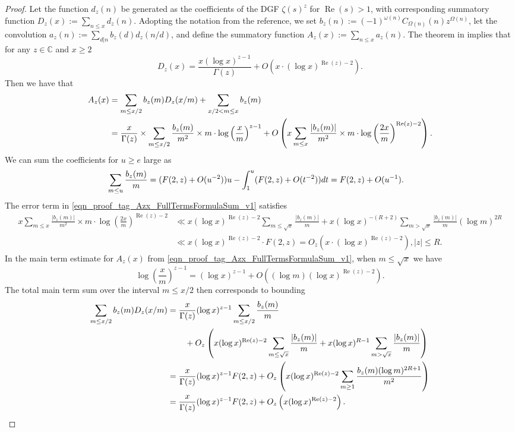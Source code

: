 \documentclass[11pt,reqno,a4letter]{article}
\numberwithin{figure}{section}
\numberwithin{table}{section}
\theoremstyle{plain}
\numberwithin{theorem}{section}
\theoremstyle{definition}
\renewcommand{\Re}{\operatorname{Re}}
\begin{document}
\begin{proof}
Let the function $d_z(n)$ be generated as the coefficients of the DGF 
$\zeta(s)^{z}$ for $\Re(s) > 1$, with corresponding 
summatory function $D_z(x) := \sum_{n \leq x} d_z(n)$. 
Adopting the notation from the reference, we set 
$b_z(n) := (-1)^{\omega(n)} C_{\Omega(n)}(n) z^{\Omega(n)}$, let the convolution 
$a_z(n) := \sum_{d|n} b_z(d) d_z(n/d)$, and define the summatory function 
$A_z(x) := \sum_{n \leq x} a_z(n)$. 
The theorem in \cite[Thm.\ 7.17; \S 7.4]{MV} implies that for any $z \in \mathbb{C}$ and $x \geq 2$ 
\[
D_z(x) = \frac{x (\log x)^{z-1}}{\Gamma(z)} + O\left(x \cdot (\log x)^{\Re(z)-2}\right). 
\]
Then we have that 
\begin{align} 
\notag 
A_z(x) & = \sum_{m \leq x/2} b_z(m) D_z(x/m) + \sum_{x/2 < m \leq x} b_z(m) \\ 
\label{eqn_proof_tag_Azx_FullTermsFormulaSum_v1} 
     & = \frac{x}{\Gamma(z)} \times \sum_{m \leq x/2} 
     \frac{b_z(m)}{m^2} \times m \cdot \log\left(\frac{x}{m}\right)^{z-1} + 
     O\left(x \sum_{m \leq x} \frac{|b_z(m)|}{m^2} \times m \cdot 
     \log\left(\frac{2x}{m}\right)^{\Re(z) - 2}\right). 
\end{align} 
We can sum the coefficients for $u \geq e$ large as 
\begin{align} 
\notag 
\sum_{m \leq u} \frac{b_z(m)}{m} & = (F(2, z) + O(u^{-2})) u - \int_1^{u} 
     (F(2, z) + O(t^{-2})) dt 
     = F(2, z) + O(u^{-1}). 
\end{align} 
The error term in \eqref{eqn_proof_tag_Azx_FullTermsFormulaSum_v1} satisfies 
\begin{align*} 
x \sum_{m \leq x} \frac{|b_z(m)|}{m^2} \times m \cdot 
     \log\left(\frac{2x}{m}\right)^{\Re(z) - 2} & \ll 
     x (\log x)^{\Re(z) - 2} \sum_{m \leq \sqrt{x}} \frac{|b_z(m)|}{m} + 
     x (\log x)^{-(R+2)} \sum_{m > \sqrt{x}} \frac{|b_z(m)|}{m} (\log m)^{2R} \\ 
     & \ll x (\log x)^{\Re(z) - 2} \cdot F(2, z) 
     = O_z\left(x \cdot (\log x)^{\Re(z) - 2}\right), |z| \leq R. 
\end{align*} 
In the main term estimate for $A_z(x)$ from 
\eqref{eqn_proof_tag_Azx_FullTermsFormulaSum_v1}, when $m \leq \sqrt{x}$ we have 
\[
\log\left(\frac{x}{m}\right)^{z-1} = (\log x)^{z-1} + 
     O\left((\log m) (\log x)^{\Re(z) - 2}\right). 
\]
The total main term sum over the interval $m \leq x/2$ then corresponds to bounding 
\begin{align*} 
\sum_{m \leq x/2} b_z(m) D_z(x/m) & = \frac{x}{\Gamma(z)} (\log x)^{z-1} 
     \sum_{m \leq x/2} \frac{b_z(m)}{m} \\ 
     & \phantom{=\quad\ } + 
     O_z\left(x (\log x)^{\Re(z)-2} \sum_{m \leq \sqrt{x}} \frac{|b_z(m)|}{m} + 
     x (\log x)^{R-1} \sum_{m > \sqrt{x}} \frac{|b_z(m)|}{m}\right) \\ 
     & = \frac{x}{\Gamma(z)} (\log x)^{z-1} F(2, z) + O_z\left( 
     x (\log x)^{\Re(z)-2} \sum_{m \geq 1} \frac{b_z(m) (\log m)^{2R+1}}{m^2} 
     \right) \\ 
     & = \frac{x}{\Gamma(z)} (\log x)^{z-1} F(2, z) + O_z\left( 
     x (\log x)^{\Re(z)-2}\right). 
     \qedhere  
\end{align*} 
\end{proof} 
\end{document}
